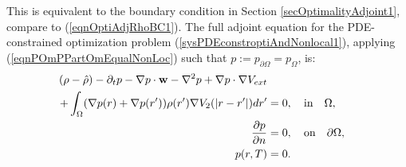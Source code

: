 This is equivalent to the boundary condition in Section \ref{secOptimalityAdjoint1}, compare to (\ref{eqnOptiAdjRhoBC1}).
The full adjoint equation for the PDE-constrained optimization problem (\ref{sysPDEconstroptiAndNonlocal1}), applying (\ref{eqnPOmPPartOmEqualNonLoc}) such that $p:=p_{\partial\Omega}=p_\Omega$, is:
\begin{align*}
 (\rho- \hat{\rho})   - \partial_t  p  - \nabla p \cdot \mathbf{w}  - \nabla^2 p \notag 
+  \nabla p \cdot \nabla V_{ext} \\
+ \int_\Omega (\nabla  p(r)+\nabla  p(r')) \rho(r') \nabla V_2(|r-r'|) dr' &=0,  \quad \text{in} \quad  \Omega,\\
\frac{\partial p }{\partial n}&=0, \quad \text{on} \quad \partial \Omega,\\
p(r,T)&=0.
\end{align*}


